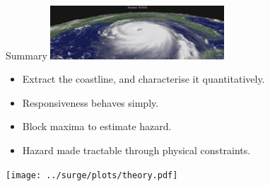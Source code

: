 \begin{frame}{Summary}
\centering
\includegraphics[height=2cm]{images/NASA-KATRINA-SIDEON.jpg}
\begin{itemize}
\item Extract the coastline, and characterise it quantitatively.
\item Responsiveness behaves simply.
\item Block maxima to estimate hazard.
\item Hazard made tractable through physical constraints.
\end{itemize}
\centering
\texttt{[image: ../surge/plots/theory.pdf]}

\end{frame}
